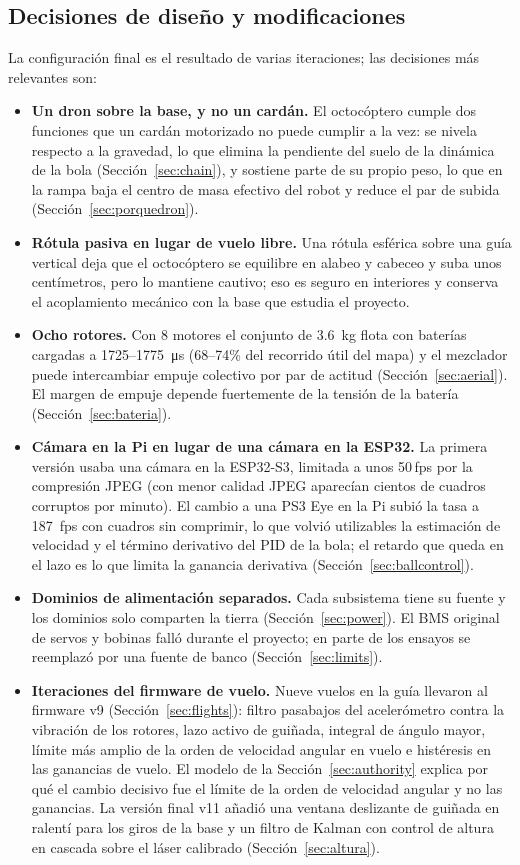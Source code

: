\subsection{Decisiones de diseño y modificaciones}
La configuración final es el resultado de varias iteraciones; las decisiones más relevantes son:
\begin{itemize}
  \item \textbf{Un dron sobre la base, y no un cardán.} El octocóptero cumple dos funciones que un cardán motorizado no puede cumplir a la vez: se nivela respecto a la gravedad, lo que elimina la pendiente del suelo de la dinámica de la bola (Sección~\ref{sec:chain}), y sostiene parte de su propio peso, lo que en la rampa baja el centro de masa efectivo del robot y reduce el par de subida (Sección~\ref{sec:porquedron}).
  \item \textbf{Rótula pasiva en lugar de vuelo libre.} Una rótula esférica sobre una guía vertical deja que el octocóptero se equilibre en alabeo y cabeceo y suba unos centímetros, pero lo mantiene cautivo; eso es seguro en interiores y conserva el acoplamiento mecánico con la base que estudia el proyecto.
  \item \textbf{Ocho rotores.} Con 8 motores el conjunto de \SI{3.6}{\kilo\gram} flota con baterías cargadas a 1725--\SI{1775}{\micro\second} (68--74\% del recorrido útil del mapa) y el mezclador puede intercambiar empuje colectivo por par de actitud (Sección~\ref{sec:aerial}). El margen de empuje depende fuertemente de la tensión de la batería (Sección~\ref{sec:bateria}).
  \item \textbf{Cámara en la Pi en lugar de una cámara en la ESP32.} La primera versión usaba una cámara en la ESP32-S3, limitada a unos 50\,fps por la compresión JPEG (con menor calidad JPEG aparecían cientos de cuadros corruptos por minuto). El cambio a una PS3 Eye en la Pi subió la tasa a \SI{187}{fps} con cuadros sin comprimir, lo que volvió utilizables la estimación de velocidad y el término derivativo del PID de la bola; el retardo que queda en el lazo es lo que limita la ganancia derivativa (Sección~\ref{sec:ballcontrol}).
  \item \textbf{Dominios de alimentación separados.} Cada subsistema tiene su fuente y los dominios solo comparten la tierra (Sección~\ref{sec:power}). El BMS original de servos y bobinas falló durante el proyecto; en parte de los ensayos se reemplazó por una fuente de banco (Sección~\ref{sec:limits}).
  \item \textbf{Iteraciones del firmware de vuelo.} Nueve vuelos en la guía llevaron al firmware v9 (Sección~\ref{sec:flights}): filtro pasabajos del acelerómetro contra la vibración de los rotores, lazo activo de guiñada, integral de ángulo mayor, límite más amplio de la orden de velocidad angular en vuelo e histéresis en las ganancias de vuelo. El modelo de la Sección~\ref{sec:authority} explica por qué el cambio decisivo fue el límite de la orden de velocidad angular y no las ganancias. La versión final v11 añadió una ventana deslizante de guiñada en ralentí para los giros de la base y un filtro de Kalman con control de altura en cascada sobre el láser calibrado (Sección~\ref{sec:altura}).
\end{itemize}
